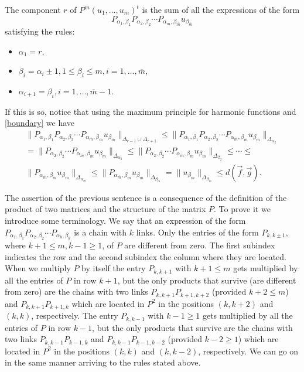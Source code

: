 \documentclass{amsart}
\numberwithin{equation}{section}
\theoremstyle{definition}
\begin{document}
The component $r$ of $P^{\overline{m}}(u_1,\ldots,u_m)^t $ is the sum of all the expressions  of the form
\[
  P_{\alpha_1,\beta_1}P_{\alpha_2,\beta_2}\cdots P_{\alpha_{\overline{m}},\beta_{\overline{m}}} u_{\beta_{\overline{m}}}
\]
satisfying the  rules:
\begin{itemize}
\item $\alpha_1 = r$,
\item $\beta_i = \alpha_i \pm 1, 1 \leq \beta_i \leq m, i=1,\ldots,{\overline{m}}$,
\item $\alpha_{i+1} = \beta_i, i=1,\ldots,{\overline{m}}-1$.
\end{itemize}
If this is so, notice that using the maximum principle for harmonic functions and \eqref{boundary} we have
\begin{multline*}
   \|P_{\alpha_1,\beta_1}P_{\alpha_2,\beta_2}\cdots P_{\alpha_{\overline{m}},\beta_{\overline{m}}} u_{\beta_{\overline{m}}}\|_{\Delta_{r-1} \cup \Delta_{r+1}} \leq \|P_{\alpha_1,\beta_1}P_{\alpha_2,\beta_2}\cdots P_{\alpha_{\overline{m}},\beta_{\overline{m}}} u_{\beta_{\overline{m}}}\|_{\Delta_{\alpha_2}}\\
    = \|P_{\alpha_2,\beta_2}\cdots P_{\alpha_{\overline{m}},\beta_{\overline{m}}} u_{\beta_{\overline{m}}}\|_{\Delta_{\alpha_2}} \leq \|P_{\alpha_2,\beta_2}\cdots P_{\alpha_{\overline{m}},\beta_{\overline{m}}} u_{\beta_{\overline{m}}}\|_{\Delta_{\beta_2}} \leq \cdots \leq	\\
	\|P_{\alpha_{\overline{m}},\beta_{\overline{m}}} u_{\beta_{\overline{m}}}\|_{\Delta_{\alpha_{\overline{m}}}} \leq  \|P_{\alpha_{\overline{m}},\beta_{\overline{m}}} u_{\beta_{\overline{m}}}\|_{\Delta_{\beta_{\overline{m}}}} = \|u_{\beta_{\overline{m}}}\|_{\Delta_{\beta_{\overline{m}}}} \leq d(\vec{f},\vec{g}).
\end{multline*}

The assertion of the previous sentence is a consequence of the definition of the product of two matrices and the structure of the matrix $P$. To prove it we introduce some terminology. We say that an expression of the form $P_{\alpha_1,\beta_1}P_{\alpha_2,\beta_2}\cdots P_{\alpha_k,\beta_k}$ is a chain with $k$ links. Only the entries of the form $P_{k,k\pm1}$, where $k+1 \leq m, k-1 \geq 1$, of $P$ are different from zero. The first subindex indicates the row and the second subindex the column where they are located. When we multiply $P$ by itself the entry $P_{k,k+1}$ with $k + 1 \leq m$ gets multiplied by all the entries of $P$ in  row $k +1$, but the only products that survive (are different from zero) are the chains with two links $P_{k,k+1}P_{k+1,k+2}$ (provided $k+2 \leq m$) and $P_{k,k+1}P_{k+1,k}$ which are located in $P^2$ in the positions $(k,k+2)$ and $(k,k)$, respectively. The entry $P_{k,k-1}$ with $k - 1 \geq 1$ gets multiplied by all the entries of $P$ in  row $k -1$, but the only products that survive   are the chains with two links $P_{k,k-1}P_{k-1,k}$ and $P_{k,k-1}P_{k-1,k-2}$ (provided $k-2 \geq 1$) which are located in $P^2$ in the positions $(k,k)$ and $(k,k-2)$, respectively.
We can go on in the same manner arriving to the rules stated above.
\end{document}
